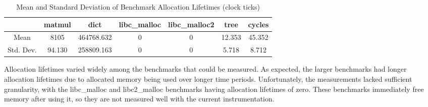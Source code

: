 \begin{table} [h!]
\centering
   \begin{tabular} {|c|c c c c c c|}
      \hline
      & matmul & dict & libc\_malloc & libc\_malloc2 & tree & cycles \\
      \hline
      Mean & 8105 & 464768.632 & 0 & 0 & 12.353 & 45.352 \\
      \hline
      Std. Dev. & 94.130 & 258809.163 & 0 & 0 & 5.718 & 8.712 \\
      \hline
   \end{tabular}
   \caption{Mean and Standard Deviation of Benchmark Allocation Lifetimes (clock ticks)}
   \label{table:6}
\end{table}

Allocation lifetimes varied widely among the benchmarks that could be measured. As expected, the larger benchmarks had longer allocation lifetimes due to allocated memory being used over longer time periods. Unfortunately, the measurements lacked sufficient granularity, with the libc\_malloc and libc2\_malloc benchmarks having allocation lifetimes of zero. These benchmarks immediately free memory after using it, so they are not measured well with the current instrumentation.
